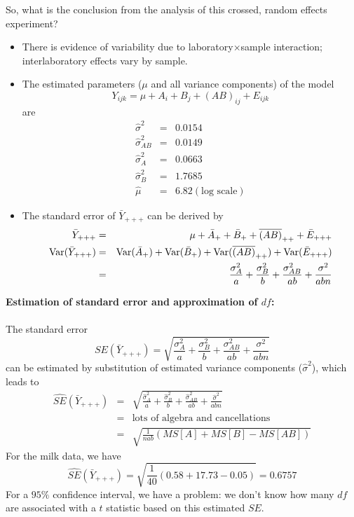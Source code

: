 \newpage

So, what is the conclusion from the analysis of this crossed, random effects experiment?

\begin{itemize}
\item There is evidence of variability due to laboratory$\times$sample interaction; interlaboratory effects vary by sample.
\item The estimated parameters ($\mu$ and all variance components) of the model
$$ Y_{ijk} = \mu + A_i + B_j + (AB)_{ij} + E_{ijk} $$
are
\begin{eqnarray*}
\hat\sigma^2 &=& 0.0154 \\
\hat\sigma_{AB}^2 &=&  0.0149 \\
\hat\sigma_{A}^2 &=&  0.0663 \\ 
\hat\sigma_{B}^2 &=&  1.7685  \\
\hat\mu &=&  6.82 (\mbox{log scale})
\end{eqnarray*}
\item The standard error of $\bar{Y}_{+++}$ can be derived by
\begin{eqnarray*}
\bar{Y}_{+++} &=& \mu + \bar{A}_{+} + \bar{B}_{+} + \overline{(AB)}_{++} + \bar{E}_{+++} \\
\mbox{Var}(\bar{Y}_{+++}) &=& \mbox{Var}(\bar{A}_{+}) + \mbox{Var}(\bar{B}_{+}) + \mbox{Var}(\overline{(AB)}_{++}) + \mbox{Var}(\bar{E}_{+++}) \\
& = & \frac{\sigma_A^2}{a} + \frac{\sigma_B^2}{b} +  \frac{\sigma_{AB}^2}{ab} + \frac{\sigma^2}{abn} 
\end{eqnarray*}
\end{itemize}
\textbf{Estimation of standard error and approximation of $df$:}\\~\\
The standard error 
$$SE(\bar{Y}_{+++}) = \sqrt{\frac{\sigma_A^2}{a} + \frac{\sigma_B^2}{b} +  \frac{\sigma_{AB}^2}{ab} + \frac{\sigma^2}{abn}}$$
can be estimated by substitution of estimated variance components ($\hat\sigma^2$), which leads to 
\begin{eqnarray*}
\widehat{SE}(\bar{Y}_{+++}) &=& \sqrt{\frac{\hat\sigma_A^2}{a} + \frac{\hat\sigma_B^2}{b} +  \frac{\hat\sigma_{AB}^2}{ab} + \frac{\hat\sigma^2}{abn}} \\
&=& \mbox{lots of algebra and cancellations}\\
&=& \sqrt{\frac{1}{nab}\left(MS[A]+MS[B]-MS[AB]\right)}
\end{eqnarray*}
For the milk data, we have
$$ \widehat{SE}(\bar{Y}_{+++}) = \sqrt{\frac{1}{40}(0.58+ 17.73-0.05)} = 0.6757$$
For a $95\%$ confidence interval, we have a problem: we don't know how many $df$ are associated with a $t$ statistic based on this estimated $SE$.  \\~\\

